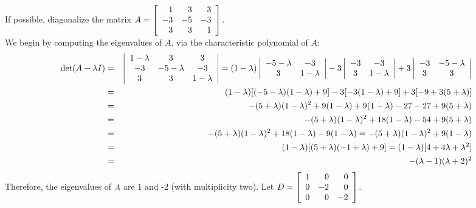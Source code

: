 \begin{Exam} If possible, diagonalize the matrix $A = \mtx{rrr}{1&3&3\\-3&-5&-3\\3&3&1}$.\\

We begin by computing the eigenvalues of $A$, via the characteristic polynomial of $A$:
\begin{eqnarray*}
\det(A-\lambda I) &=&  \dtx{ccc}{1-\lambda&3&3\\-3&-5-\lambda&-3\\3&3&1-\lambda} = (1-\lambda)\dtx{cc}{-5-\lambda&-3\\3&1-\lambda} - 3\dtx{cc}{-3&-3\\3&1-\lambda} + 3\dtx{cc}{-3&-5-\lambda\\3&3}\\
&=& (1-\lambda)[(-5-\lambda)(1-\lambda) + 9] -3[-3(1-\lambda)+9] + 3[-9+3(5+\lambda)]\\
&=& -(5+\lambda)(1-\lambda)^2 + 9(1-\lambda) +9(1-\lambda) - 27 -27 + 9(5+\lambda)\\
&=& -(5+\lambda)(1-\lambda)^2 + 18(1-\lambda) - 54 + 9(5+\lambda)\\
&=& -(5+\lambda)(1-\lambda)^2 + 18(1-\lambda) -9(1-\lambda) = -(5+\lambda)(1-\lambda)^2 + 9(1-\lambda)\\
&=&(1-\lambda)[(5+\lambda)(-1+\lambda)+9] = (1-\lambda)[4 + 4\lambda + \lambda^2]\\
&=& -(\lambda-1)(\lambda+2)^2
\end{eqnarray*} Therefore, the eigenvalues of $A$ are 1 and -2 (with multiplicity two). Let $D = \mtx{rrr}{1&0&0\\0&-2&0\\0&0&-2}$.\\


\end{Exam}
